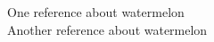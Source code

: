 \documentclass{article}
\begin{document}
	\begin{flushleft}
		One reference about watermelon \cite{gostout1992clinical} \\ 
		Another reference about watermelon \cite{rivero2001resistance}
		
		
	\end{flushleft}
\end{document}

